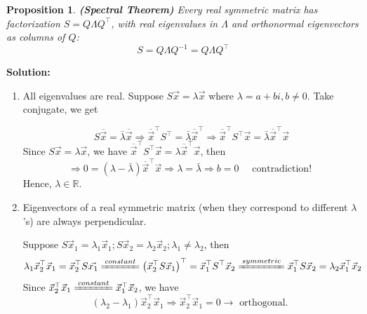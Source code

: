 \documentclass[13pt]{article}
\newtheorem{proposition}[theorem]{Proposition}
\theoremstyle{definition}
\newenvironment{solution}
{\color{C2}\begin{framed}\begingroup\textbf{Solution:} }
  {\endgroup\end{framed}}
\theoremstyle{remark}
\begin{document}
\begin{proposition}
    \textbf{(Spectral Theorem)}
Every real symmetric matrix has factorization $S = Q\Lambda Q^\top$, with real eigenvalues in $\Lambda$ and orthonormal eigenvectors as columns of $Q$:
\[
S = Q\Lambda Q^{-1} = Q\Lambda Q^\top
\]
\end{proposition}

\begin{solution}
\begin{enumerate}
    \item All eigenvalues are real.
Suppose $S \vec{x}=\lambda \vec{x}$ where $\lambda=a+b i, b \neq 0$. 
Take 
conjugate, we get

\[
S \overline{\vec{x}}=\bar{\lambda} \overline{\vec{x}} 
\Rightarrow \overline{\vec{x}}^{\top} S^{\top}=\bar{\lambda} \overline{\vec{x}}^{\top} 
\Rightarrow \overline{\vec{x}}^{\top} S^{\top} \vec{x}=\bar{\lambda} \overline{\vec{x}}^{\top} \vec{x}
\]
Since $S \vec{x}=\lambda \vec{x}$, we have $\overline{\vec{x}}^{\top} S^{\top} \vec{x}=\lambda \overline{\vec{x}}^{\top} \vec{x}$, then
\[
\Rightarrow 0=(\lambda-\bar{\lambda})\overline{\vec{x}}^{\top} \vec{x}
\Rightarrow \lambda=\bar{\lambda}
\Rightarrow b=0 \quad \text { contradiction! }
\]
Hence, $\lambda \in \mathbb{R}$.
\item Eigenvectors of a real symmetric matrix (when they correspond to different $\lambda$ 's) are always perpendicular.

Suppose $S \vec{x}_1=\lambda_1 \vec{x}_1 ; S \vec{x}_2=\lambda_2 \vec{x}_2 ; \lambda_1 \neq \lambda_2$, then
\[
\lambda_1 \vec{x}_2^{\top} \vec{x}_1 =\vec{x}_2^{\top} S \vec{x_1}
\xlongequal{constant} \left(\vec{x}_2^{\top} S \vec{x}_1\right)^{\top}=\vec{x}_1^{\top} S^{\top} \vec{x}_2
\xlongequal{symmetric}\vec{x}_1^{\top} S \vec{x}_2=\lambda_2 \vec{x}_1^{\top} \vec{x}_2 
\]
Since $\vec{x}_2^{\top} \vec{x}_1 \xlongequal{constant} \vec{x}_1^{\top} \vec{x}_2$, we have
\[
(\lambda_2-\lambda_1) \vec{x}_2^{\top} \vec{x}_1 
\Rightarrow \vec{x}_2^{\top} \vec{x}_1=0
\rightarrow \text { orthogonal. }
\]
\end{enumerate}

\end{solution}
\end{document}
